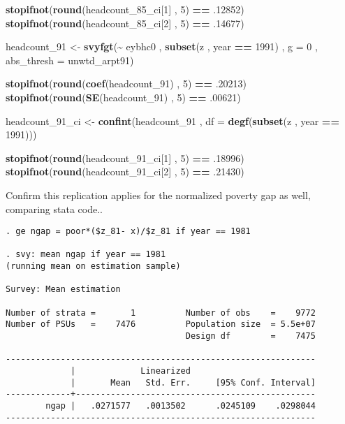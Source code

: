 \documentclass[
]{book}
\newenvironment{Shaded}{\begin{snugshade}}{\end{snugshade}}
\newcommand{\AttributeTok}[1]{\textcolor[rgb]{0.13,0.29,0.53}{#1}}
\newcommand{\DecValTok}[1]{\textcolor[rgb]{0.00,0.00,0.81}{#1}}
\newcommand{\FunctionTok}[1]{\textcolor[rgb]{0.13,0.29,0.53}{\textbf{#1}}}
\newcommand{\NormalTok}[1]{#1}
\newcommand{\OtherTok}[1]{\textcolor[rgb]{0.56,0.35,0.01}{#1}}
\newcommand{\SpecialCharTok}[1]{\textcolor[rgb]{0.81,0.36,0.00}{\textbf{#1}}}
\begin{document}
\begin{Shaded}
\begin{Highlighting}[]
\FunctionTok{stopifnot}\NormalTok{(}\FunctionTok{round}\NormalTok{(headcount\_85\_ci[}\DecValTok{1}\NormalTok{] , }\DecValTok{5}\NormalTok{) }\SpecialCharTok{==}\NormalTok{ .}\DecValTok{12852}\NormalTok{)}
\FunctionTok{stopifnot}\NormalTok{(}\FunctionTok{round}\NormalTok{(headcount\_85\_ci[}\DecValTok{2}\NormalTok{] , }\DecValTok{5}\NormalTok{) }\SpecialCharTok{==}\NormalTok{ .}\DecValTok{14677}\NormalTok{)}

\NormalTok{headcount\_91 }\OtherTok{\textless{}{-}}
  \FunctionTok{svyfgt}\NormalTok{(}\SpecialCharTok{\textasciitilde{}}\NormalTok{ eybhc0 ,}
         \FunctionTok{subset}\NormalTok{(z , year }\SpecialCharTok{==} \DecValTok{1991}\NormalTok{) ,}
         \AttributeTok{g =} \DecValTok{0}\NormalTok{ ,}
         \AttributeTok{abs\_thresh =}\NormalTok{ unwtd\_arpt91)}


\FunctionTok{stopifnot}\NormalTok{(}\FunctionTok{round}\NormalTok{(}\FunctionTok{coef}\NormalTok{(headcount\_91) , }\DecValTok{5}\NormalTok{) }\SpecialCharTok{==}\NormalTok{ .}\DecValTok{20213}\NormalTok{)}
\FunctionTok{stopifnot}\NormalTok{(}\FunctionTok{round}\NormalTok{(}\FunctionTok{SE}\NormalTok{(headcount\_91) , }\DecValTok{5}\NormalTok{) }\SpecialCharTok{==}\NormalTok{ .}\DecValTok{00621}\NormalTok{)}

\NormalTok{headcount\_91\_ci }\OtherTok{\textless{}{-}}
  \FunctionTok{confint}\NormalTok{(headcount\_91 , }\AttributeTok{df =} \FunctionTok{degf}\NormalTok{(}\FunctionTok{subset}\NormalTok{(z , year }\SpecialCharTok{==} \DecValTok{1991}\NormalTok{)))}

\FunctionTok{stopifnot}\NormalTok{(}\FunctionTok{round}\NormalTok{(headcount\_91\_ci[}\DecValTok{1}\NormalTok{] , }\DecValTok{5}\NormalTok{) }\SpecialCharTok{==}\NormalTok{ .}\DecValTok{18996}\NormalTok{)}
\FunctionTok{stopifnot}\NormalTok{(}\FunctionTok{round}\NormalTok{(headcount\_91\_ci[}\DecValTok{2}\NormalTok{] , }\DecValTok{5}\NormalTok{) }\SpecialCharTok{==}\NormalTok{ .}\DecValTok{21430}\NormalTok{)}
\end{Highlighting}
\end{Shaded}

Confirm this replication applies for the normalized poverty gap as well, comparing stata code..

\begin{verbatim}
. ge ngap = poor*($z_81- x)/$z_81 if year == 1981

. svy: mean ngap if year == 1981
(running mean on estimation sample)

Survey: Mean estimation

Number of strata =       1          Number of obs    =    9772
Number of PSUs   =    7476          Population size  = 5.5e+07
                                    Design df        =    7475

--------------------------------------------------------------
             |             Linearized
             |       Mean   Std. Err.     [95% Conf. Interval]
-------------+------------------------------------------------
        ngap |   .0271577   .0013502      .0245109    .0298044
--------------------------------------------------------------
\end{verbatim}
\end{document}
